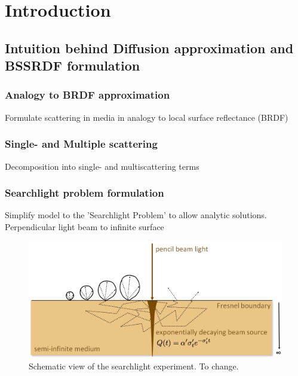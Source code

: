 \chapter{Introduction}
\label{chapter:introduction}







\section{Intuition behind Diffusion approximation and BSSRDF formulation}

\subsection{Analogy to BRDF approximation}
\label{section:BSSRDF_intuition}
Formulate scattering in media in analogy to local surface reflectance (BRDF)

\subsection{Single- and Multiple scattering}
Decomposition into single- and multiscattering terms

\subsection{Searchlight problem formulation}
\label{section:searchlight}
Simplify model to the 'Searchlight Problem' to allow analytic solutions.
Perpendicular light beam to infinite surface \cite{Jacques1995}
\begin{figure}[h]
    \centering
    \includegraphics[width=\textwidth]{imgs/schemes/searchlight_disney}
    \caption{Schematic view of the searchlight experiment. To change.}
    \label{fig:searchlight_scheme}
\end{figure}


